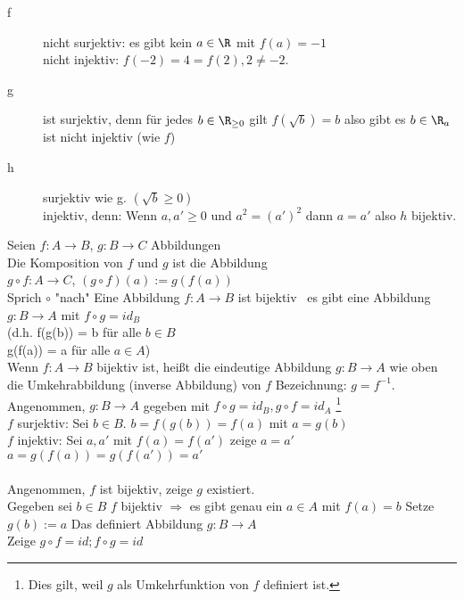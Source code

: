\begin{description}
\item[f]{
\hspace{6mm}nicht surjektiv: es gibt kein $a\in\R$ mit $f(a)=-1$\\
nicht injektiv: $f(-2)=4=f(2), 2\neq -2.$}
%
\item[g]{
\hspace{5mm}ist surjektiv, denn für jedes $b \in \R_{\geq 0}$ gilt $f( \sqrt{b} ) = b$ also gibt es $b \in \R_a$\\
 ist nicht injektiv (wie $f$)}
%
\item[h]{
\hspace{5mm}surjektiv wie g. $(\sqrt{b} \geq 0)$\\
injektiv, denn: Wenn $a, a' \geq 0$ und $a^2 = (a')^2$ dann $a = a'$ also $h$ bijektiv.}
\end{description}
%
Seien $f:A→B$, $g:B→C$ Abbildungen\\
Die Komposition von $f$ und $g$ ist die Abbildung\\
$g \circ  f: A→C$, $(g \circ f)(a):=g(f(a))$\\
Sprich $\circ$ "nach"
%
%
Eine Abbildung $f: A \to B$ ist bijektiv \equ \ es gibt eine Abbildung $g: B \to A$ mit $f \circ g = id_B$\\
(d.h. f(g(b)) = b für alle $b \in B$\\
      g(f(a)) = a für alle $a \in A$)\\
%
Wenn $f:A→B$ bijektiv ist, heißt die eindeutige Abbildung $g:B→A$ wie oben die Umkehrabbildung (inverse Abbildung) von $f$
Bezeichnung: $g=f^{-1}$.\\
%
\bew
Angenommen, $g: B \to A$ gegeben mit $f \circ g = id_B, g \circ f = id_A$ \footnote{Dies gilt, weil $g$ als Umkehrfunktion von $f$ definiert ist.}\\
$f$ surjektiv: Sei $b \in B$. $b = f(g(b)) = f(a)$ mit $a = g(b)$ \ok\\
$f$ injektiv: Sei $a, a'$ mit $f(a) = f(a')$ zeige $a = a'$ \\
$a = g(f(a)) = g(f(a')) = a' $\ok \\ \\
%
Angenommen, $f$ ist bijektiv, zeige $g$ existiert.\\
Gegeben sei $b \in B$ $f$ bijektiv $\Rightarrow$ es gibt genau ein $a \in A $ mit $f(a) = b$ 
Setze $g(b):=a$ Das definiert Abbildung $g:B→A$\\
Zeige $g \circ f=id; f \circ g = id$\\
